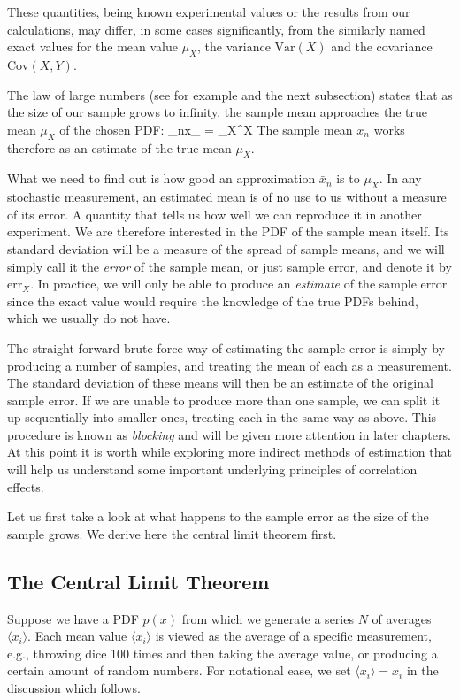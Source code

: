 These quantities, being known experimental values or the results from our calculations, 
may differ, in some cases
significantly,  from the similarly named
exact values for the mean value $\mu_X$, the variance $\mathrm{Var}(X)$
and the covariance $\mathrm{Cov}(X,Y)$. 


The law of large numbers (see for example \cite{rice} and the next subsection)
states that as the size of our sample grows to infinity, the sample
mean approaches the true mean $\mu_X^{\phantom X}$ of the chosen PDF:
\bdm
\lim_{n\to\infty}\langle x_{\alpha} \rangle = \mu_X^{\phantom X}
\edm
The sample mean $\bar x_n$ works therefore as an estimate of the true
mean $\mu_X^{\phantom X}$.

What we need to find out is how good an approximation $\bar x_n$ is to
$\mu_X^{\phantom X}$. In any stochastic measurement, an estimated
mean is of no use to us without a measure of its error. A quantity
that tells us how well we can reproduce it in another experiment. We
are therefore interested in the PDF of the sample mean itself. Its
standard deviation will be a measure of the spread of sample means,
and we will simply call it the \emph{error} of the sample mean, or
just sample error, and denote it by $\mathrm{err}_X^{\phantom X}$. In
practice, we will only be able to produce an \emph{estimate} of the
sample error since the exact value would require the knowledge of the
true PDFs behind, which we usually do not have.

The straight forward brute force way of estimating the sample error is
simply by producing a number of samples, and treating the mean of each
as a measurement. The standard deviation of these means will then be
an estimate of the original sample error. If we are unable to produce
more than one sample, we can split it up sequentially into smaller
ones, treating each in the same way as above. This procedure is known
as \emph{blocking} and will be given more attention in later chapters. At this
point it is worth while exploring more indirect methods of estimation
that will help us understand some important underlying principles of
correlation effects.

Let us first take a look at what happens to the sample error as the
size of the sample grows. We derive here the central limit theorem first.

\subsection{The Central Limit Theorem}\label{subsec:centrallimit}
Suppose we have a PDF $p(x)$ from which we generate  a series $N$
of averages $\langle x_i \rangle$. Each mean value $\langle x_i \rangle$
is viewed as the average of a specific measurement, e.g., throwing 
dice 100 times and then taking the average value, or producing a certain
amount of random numbers. 
For notational ease, we set $\langle x_i \rangle=x_i$ in the discussion
which follows. 

